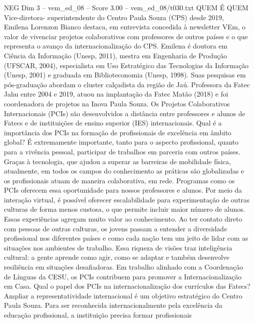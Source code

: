 \begin{textsample}{NEG Dim 3 – vem\_ed\_08 – Score 3.00 – vem\_ed\_08/t030.txt}  \label{ex:f3_neg_091}
QUEM É QUEM Vice-diretora- superintendente do Centro Paula Souza (CPS) desde 2019, Emilena Lorenzon Bianco destaca, em entrevista concedida à newsletter VEm, o valor de vivenciar projetos colaborativos com professores de outros países e o que representa o avanço da internacionalização do CPS.
Emilena é doutora em Ciência da Informação (Unesp, 2011), mestra em Engenharia de Produção (UFSCAR, 2004), especialista em Uso Estratégico das Tecnologias da Informação (Unesp, 2001) e graduada em Biblioteconomia (Unesp, 1998).
Suas pesquisas em pós-graduação abordam o cluster calçadista da região de Jaú.
Professora da Fatec Jahu entre 2004 e 2019, atuou na implantação da Fatec Matão (2018) e foi coordenadora de projetos na Inova Paula Souza.
Os Projetos Colaborativos Internacionais (PCIs) são desenvolvidos a distância entre professores e alunos de Fatecs e de instituições de ensino superior (IES) internacionais.
Qual é a importância dos PCIs na formação de profissionais de excelência em âmbito global?
É extremamente importante, tanto para o aspecto profissional, quanto para a vivência pessoal, participar de trabalhos em parceria com outros países.
Graças à tecnologia, que ajudou a superar as barreiras de mobilidade física, atualmente, em todos os campos do conhecimento as práticas são globalizadas e os profissionais atuam de maneira colaborativa, em rede.
Programas como os PCIs oferecem essa oportunidade para nossos professores e alunos.
Por meio da interação virtual, é possível oferecer escalabilidade para experimentação de outras culturas de forma menos custosa, o que permite incluir maior número de alunos.
Essas experiências agregam muito valor ao conhecimento.
Ao ter contato direto com pessoas de outras culturas, os jovens passam a entender a diversidade profissional nos diferentes países e como cada nação tem um jeito de lidar com as situações nos ambientes de trabalho.
Essa riqueza de visões traz inteligência cultural: a gente aprende como agir, como se adaptar e também desenvolve resiliência em situações desafiadoras.
Em trabalho alinhado com a Coordenação de Línguas da CESU, os PCIs contribuem para promover a Internacionalização em Casa.
Qual o papel dos PCIs na internacionalização dos currículos das Fatecs?
Ampliar a representatividade internacional é um objetivo estratégico do Centro Paula Souza.
Para ser reconhecida internacionalmente pela excelência da educação profissional, a instituição precisa formar profissionais

\end{textsample}
